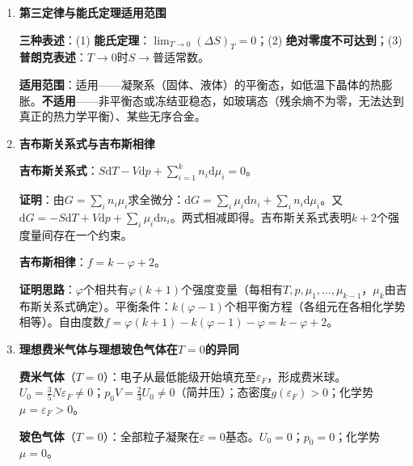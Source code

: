 \documentclass[12pt,a4paper,fontset=mac]{ctexart}
\newcommand{\dd}{\mathrm{d}}
\newcommand{\đ}{\mathrm{đ}}
\begin{document}
\begin{enumerate}
\textbf{过饱和蒸气和过热液体的解释}：

在$p$-$V$图上（$T<T_c$），范德瓦尔斯等温线在气液共存区呈S形。中间段$\partial p/\partial V>0$违反力学稳定性条件，不可能稳定存在。用麦克斯韦等面积法则确定气液共存压强$p_{\text{coex}}$。在S形曲线的亚稳段（$\partial p/\partial V<0$但偏离平衡线），分别对应过饱和蒸气（压强高于$p_{\text{coex}}$的气态）和过热液体（压强低于$p_{\text{coex}}$的液态）。

在$\mu$-$p$图上，在$p_{\text{coex}}$处$\mu$-$p$曲线出现交叉：较高化学势的分支对应亚稳态。当过饱和蒸气中出现足够大的液滴（临界核），或过热液体中形成足够大的气泡时，系统将通过一级相变跃迁到稳定相。

\item \textbf{第三定律与能氏定理适用范围}

\textbf{三种表述}：(1) \textbf{能氏定理}：$\lim_{T\to0}(\Delta S)_T=0$；(2) \textbf{绝对零度不可达到}；(3) \textbf{普朗克表述}：$T\to0$时$S\to$普适常数。

\textbf{适用范围}：适用——凝聚系（固体、液体）的平衡态，如低温下晶体的热膨胀。\textbf{不适用}——非平衡态或冻结亚稳态，如玻璃态（残余熵不为零，无法达到真正的热力学平衡）、某些无序合金。

\item \textbf{吉布斯关系式与吉布斯相律}

\textbf{吉布斯关系式}：$S\dd T - V\dd p + \sum_{i=1}^k n_i\dd\mu_i = 0$。

\textbf{证明}：由$G=\sum_in_i\mu_i$求全微分：$\dd G=\sum_i\mu_i\dd n_i+\sum_in_i\dd\mu_i$。又$\dd G=-S\dd T+V\dd p+\sum_i\mu_i\dd n_i$。两式相减即得。吉布斯关系式表明$k+2$个强度量间存在一个约束。

\textbf{吉布斯相律}：$f = k - \varphi + 2$。

\textbf{证明思路}：$\varphi$个相共有$\varphi(k+1)$个强度变量（每相有$T,p,\mu_1,\ldots,\mu_{k-1}$，$\mu_k$由吉布斯关系式确定）。平衡条件：$k(\varphi-1)$个相平衡方程（各组元在各相化学势相等）。自由度数$f = \varphi(k+1) - k(\varphi-1) - \varphi = k - \varphi + 2$。

\item \textbf{理想费米气体与理想玻色气体在$T=0$的异同}

\textbf{费米气体}（$T=0$）：电子从最低能级开始填充至$\varepsilon_F$，形成费米球。$U_0=\frac{3}{5}N\varepsilon_F\neq0$；$p_0V=\frac{2}{3}U_0\neq0$（简并压）；态密度$g(\varepsilon_F)>0$；化学势$\mu=\varepsilon_F>0$。

\textbf{玻色气体}（$T=0$）：全部粒子凝聚在$\varepsilon=0$基态。$U_0=0$；$p_0=0$；化学势$\mu=0$。


\end{enumerate}
\end{document}
